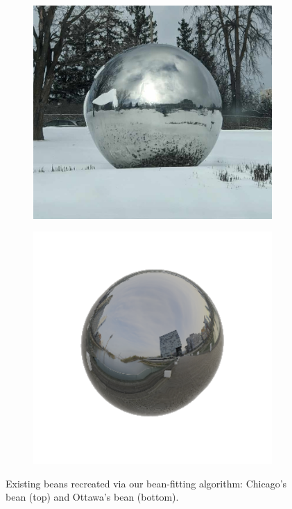 \documentclass[%
reprint,
twocolumn,
nofootinbib,
 amsmath,amssymb,
 aps,
]{revtex4-2}
\begin{document}
\begin{figure}[h]
\begin{subfigure}{0.23\textwidth}
        \includegraphics[width=0.98\linewidth]{img/ottawa-sphere.jpg}
    \end{subfigure}
    \begin{subfigure}{0.23\textwidth}
        \includegraphics[width=0.98\linewidth]{img/sphere-bean.png}
    \end{subfigure}
    \caption{Existing beans recreated via our bean-fitting algorithm: Chicago's bean (top) and Ottawa's bean (bottom).}
    \label{fig:validation}
\end{figure}
\end{document}
